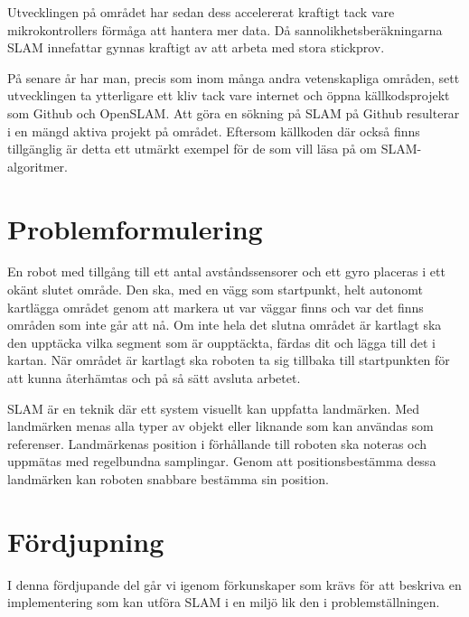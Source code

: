 \documentclass[a4paper,12pt,fleqn]{article}
\begin{document}
Utvecklingen på området har sedan dess accelererat kraftigt tack vare
mikrokontrollers förmåga att hantera mer data. Då sannolikhetsberäkningarna SLAM innefattar gynnas kraftigt av att arbeta med stora stickprov. 

På senare år har man, precis som inom många andra vetenskapliga områden, sett utvecklingen ta ytterligare ett kliv tack vare internet och öppna källkodsprojekt som Github och OpenSLAM. Att göra en sökning på SLAM på Github resulterar i en mängd aktiva projekt på området. Eftersom källkoden där också finns tillgänglig är detta ett utmärkt exempel för de som vill läsa på om SLAM-algoritmer. 


\section{Problemformulering}

En robot med tillgång till ett antal avståndssensorer och ett gyro placeras i ett okänt slutet område. Den ska, med en vägg som startpunkt, helt autonomt kartlägga området genom att markera ut var väggar finns och var det finns områden som inte går att nå. Om inte hela det slutna området är kartlagt ska den upptäcka vilka segment som är oupptäckta, färdas dit och lägga till det i kartan. När området är kartlagt ska roboten ta sig tillbaka till startpunkten för att kunna återhämtas och på så sätt avsluta arbetet. 

SLAM är en teknik där ett system visuellt kan uppfatta landmärken. Med landmärken menas alla typer av objekt eller liknande som kan användas som referenser. Landmärkenas position i förhållande till roboten ska noteras och uppmätas med regelbundna samplingar. Genom att positionsbestämma dessa landmärken kan roboten snabbare bestämma sin position. 



\newpage
\section{Fördjupning}
I denna fördjupande del går vi igenom förkunskaper som krävs för att beskriva en implementering som kan utföra SLAM i en miljö lik den i problemställningen. 
\end{document}
